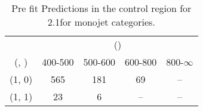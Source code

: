 \begin{table}[h!]
\tiny
\centering
\caption{Pre fit Predictions in the \gj control region for 2.1\ifb for monojet categories.\label{tab:predsepnaive_gj_data_mono}}
\begin{tabular}
{ccccc}
	\hline\hline
	& \multicolumn{4}{c}{\scalht (\gev)} \\ 
	 (\njet,  \nb) & 400-500 & 500-600 & 600-800 & 800-$\infty$ \\ [0.8ex] 
\hline
	(1, 0) & 565 & 181 & 69 & -- \\[0.5ex] 
	(1, 1) & 23 & 6 & -- & -- \\[0.5ex] 
	\hline
	\hline
\end{tabular}
\end{table}
